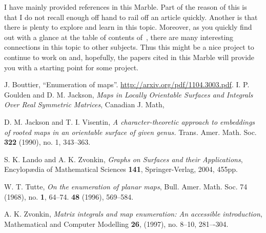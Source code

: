 \documentclass{axolotl}
\begin{document}
I have mainly provided references in this Marble. Part of the reason of this is
that I do not recall enough off hand to rail off an article quickly. Another is
that there is plenty to explore and learn in this topic. Moreover, as you
quickly find out with a glance at the table of contents of~\cite{LZ}, there are
many interesting connections in this topic to other subjects. Thus this might
be a nice project to continue to work on and, hopefully, the papers cited in
this Marble will provide you with a starting point for some project.

\begin{thebibliography}{9}
    J. Bouttier,
    ``Enumeration of maps''.
    \url{http://arxiv.org/pdf/1104.3003.pdf}.
    I. P. Goulden and D. M. Jackson,
    \emph{Maps in Locally Orientable Surfaces and Integrals Over Real Symmetric Matrices},
    Canadian J. Math,

    D. M. Jackson and T. I. Visentin,
    \emph{A character-theoretic approach to embeddings of rooted maps in an orientable surface of given genus.}
    Trans. Amer. Math. Soc.
    \textbf{322} (1990), no. 1, 343--363.

    S. K. Lando and A. K. Zvonkin,
    \emph{Graphs on Surfaces and their Applications},
    Encylop\ae dia of Mathematical Sciences \textbf{141},
    Springer-Verlag, 2004, 455pp.

    W. T. Tutte,
    \emph{On the enumeration of planar maps},
    Bull. Amer. Math. Soc. 74 (1968),
    no. \textbf{1}, 64--74.
    \textbf{48} (1996), 569--584.

    A. K. Zvonkin,
    \emph{Matrix integrals and map enumeration: An accessible introduction},
    Mathematical and Computer Modelling
    \textbf{26}, (1997),
    no. 8–10, 281–-304.
\end{thebibliography}
\end{document}
